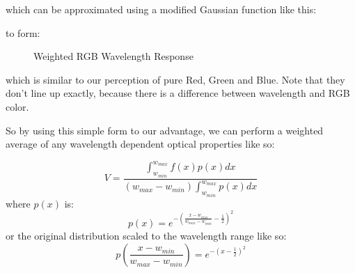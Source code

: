 \documentclass[12pt,letterpaper]{article}
\begin{document}
which can be approximated using a modified Gaussian function like this:
\begin{center}
	\pgfplotsset{width=15em}
\end{center}

to form:

\begin{figure}[htbp]
    \centering
	\pgfplotsset{width=30em, height=15em}
	\caption{Weighted RGB Wavelength Response}
	\label{fig:rgb_wavelength_response}
\end{figure}
which is similar to our perception of pure Red, Green and Blue. Note that they don't line up exactly, 
because there is a difference between wavelength and RGB color.

So by using this simple form to our advantage, we can perform a weighted average of 
any wavelength dependent optical properties like so:

$$
V = \frac{\int_{w_{min}}^{w_{max}}{f\left(x\right)p\left(x\right)dx}}
     {\left( w_{max} - w_{min} \right) \int_{w_{min}}^{w_{max}}{p\left(x\right)dx}}
$$
where $p(x)$ is:
$$
p(x) = e^{-{\left( \frac{x-w_{min}}{w_{max}-w_{min}} - \frac{1}{2} \right)}^2}
$$
or the original distribution scaled to the wavelength range like so:
$$
p(\frac{x-w_{min}}{w_{max}-w_{min}}) = e^{-{\left( x - \frac{1}{2} \right)}^2}
$$
\end{document}
